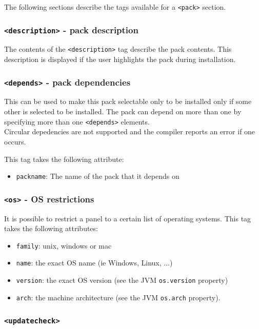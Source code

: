 The following sections describe the tags available for a \texttt{<pack>} section.

\subsubsection{\texttt{<description>} - pack description}

The contents of the \texttt{<description>} tag describe the pack contents.
This description is displayed if the user highlights the pack during 
installation.

\subsubsection{\texttt{<depends>} - pack dependencies}
This can be used to make this pack selectable only to be installed only if some other is 
selected to be installed. The pack can depend on more than one by specifying more than one
\texttt{<depends>} elements.\\ 
Circular depedencies are not supported and the compiler reports an error if one occurs.

This tag takes the following attribute:
\begin{itemize}
\item \texttt{packname}: The name of the pack that it depends on
\end{itemize}

\subsubsection{\texttt{<os>} - OS restrictions}

It is possible to restrict a panel to a certain list of operating systems. This
tag takes the following attributes:
\begin{itemize}
\item \texttt{family}: unix, windows or mac
\item \texttt{name}: the exact OS name (ie Windows, Linux, ...)
\item \texttt{version}: the exact OS version (see the JVM \texttt{os.version} property)
\item \texttt{arch}: the machine architecture (see the JVM \texttt{os.arch} property).
\end{itemize}

\subsubsection{\texttt{<updatecheck>}}

